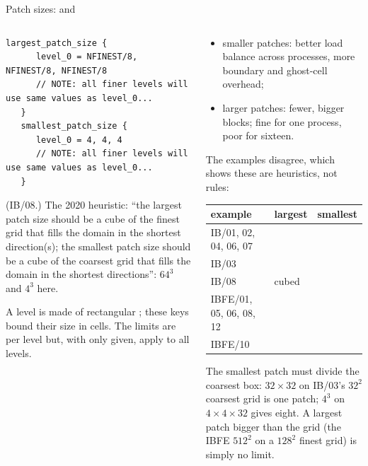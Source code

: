 \documentclass[aspectratio=169,11pt]{beamer}
\begin{document}
\begin{frame}[fragile]{Patch sizes:  and }
\label{fr:patches}
\begin{columns}[T,onlytextwidth]
\begin{column}{0.5\textwidth}
\begin{lstlisting}[style=inputtiny]
   largest_patch_size {
      level_0 = NFINEST/8, NFINEST/8, NFINEST/8
      // NOTE: all finer levels will use same values as level_0...
   }
   smallest_patch_size {
      level_0 = 4, 4, 4
      // NOTE: all finer levels will use same values as level_0...
   }
\end{lstlisting}
\footnotesize (IB/08.) The 2020 heuristic: ``the largest patch size should be a cube of the finest grid that fills the domain in the shortest direction(s); the smallest patch size should be a cube of the coarsest grid that fills the domain in the shortest directions'': $64^3$ and $4^3$ here.
\vspace{1mm}

\footnotesize A level is made of rectangular ; these keys bound their size in cells. The limits are per level but, with only  given, apply to all levels.
\end{column}
\begin{column}{0.48\textwidth}
\scriptsize
\begin{itemize}
  \item smaller patches: better load balance across processes, more boundary and ghost-cell overhead;
  \item larger patches: fewer, bigger blocks; fine for one process, poor for sixteen.
\end{itemize}
\scriptsize The examples disagree, which shows these are heuristics, not rules:
\vspace{1mm}

\scriptsize
\begin{tabular}{@{}L{0.4\textwidth}L{0.28\textwidth}L{0.2\textwidth}@{}}
\toprule
example & largest & smallest\\
\midrule
IB/01, 02, 04, 06, 07 &  & \\
IB/03 &  & \\
IB/08 &  cubed & \\
IBFE/01, 05, 06, 08, 12 &  & \\
IBFE/10 &  & \\
\bottomrule
\end{tabular}

\vspace{1mm}

\scriptsize The smallest patch must divide the coarsest box: $32 \times 32$ on IB/03's $32^2$ coarsest grid is one patch; $4^3$ on $4 \times 4 \times 32$ gives eight. A largest patch bigger than the grid (the IBFE $512^2$ on a $128^2$ finest grid) is simply no limit.
\end{column}
\end{columns}
\end{frame}
\end{document}
